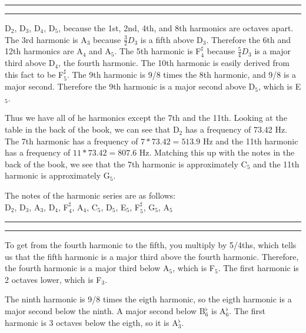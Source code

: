 \documentclass[11pt]{article}
\newcounter{questionCounter}
\newcounter{partCounter}[questionCounter]
\newenvironment{question}[2][\arabic{questionCounter}]{%
    \setcounter{partCounter}{0}%
    \vspace{.25in} \hrule \vspace{0.5em}%
        \noindent{\bf #2}%
    \vspace{0.8em} \hrule \vspace{.10in}%
    \addtocounter{questionCounter}{1}%
}{}
\begin{document}
\begin{question}{Problem 5}
D$_2$, D$_3$, D$_4$, D$_5$, because the 1st, 2nd, 4th, and 8th harmonics are octaves apart.
The 3rd harmonic is A$_3$ because $\frac{3}{2}D_3$ is a fifth above D$_3$.
Therefore the 6th and 12th harmonics are A$_4$ and A$_5$.
The 5th harmonic is F$_4^{\sharp}$ because $\frac{5}{4}D_3$ is a major third above D$_4$,
    the fourth harmonic.
The 10th harmonic is easily derived from this fact to be F$_5^{\sharp}$.
The 9th harmonic is 9/8 times the 8th harmonic, and 9/8 is a major second. Therefore
the 9th harmonic is a major second above D$_5$, which is E$_5$.

Thus we have all of he harmonics except the 7th and the 11th. Looking at the table
in the back of the book, we can see that D$_2$ has a frequency of 73.42 Hz. The 
7th harmonic has a frequency of $7*73.42 = 513.9$ Hz and the 11th harmonic has a 
frequency of $11*73.42 = 807.6$ Hz. Matching this up with the notes in the back
of the book, we see that the 7th harmonic is approximately C$_5$ and the 11th
harmonic is approximately G$_5$.

The notes of the harmonic series are as follows:\\
D$_2$, D$_3$, A$_3$, D$_4$, F$_4^\sharp$, A$_4$, C$_5$, D$_5$, E$_5$, F$_5^\sharp$, G$_5$, A$_5$
\end{question}
\begin{question}{Problem 5}
To get from the fourth harmonic to the fifth, you multiply by 5/4ths, which tells us
that the fifth harmonic is a major third above the fourth harmonic. Therefore, 
the fourth harmonic is a major third below A$_5$, which is F$_5$. The first 
harmonic is 2 octaves lower, which is F$_3$.

The ninth harmonic is 9/8 times the eigth harmonic, so the eigth harmonic is a 
major second below the ninth. A major second below B$_6^{\flat}$ is A$_6^{\flat}$.
The first harmonic is 3 octaves below the eigth, so it is A$_3^{\flat}$.
\end{question}
\end{document}

